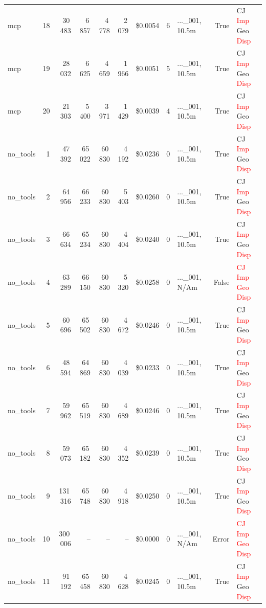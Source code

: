 \documentclass[a4paper,11pt]{article}
\begin{document}
\begin{table}[H]
{\begin{tabular}{l r r r r r r r l r l}
mcp & 18 & 30\,483 & 6\,857 & 4\,778 & 2\,079 & \$0.0054 & 6 & ...\_001, 10.5m & True & CJ \textcolor{red}{Imp} Geo \textcolor{red}{Disp} \\
mcp & 19 & 28\,032 & 6\,625 & 4\,659 & 1\,966 & \$0.0051 & 5 & ...\_001, 10.5m & True & CJ \textcolor{red}{Imp} Geo \textcolor{red}{Disp} \\
mcp & 20 & 21\,303 & 5\,400 & 3\,971 & 1\,429 & \$0.0039 & 4 & ...\_001, 10.5m & True & CJ \textcolor{red}{Imp} Geo \textcolor{red}{Disp} \\
\midrule
no\_tools & 1 & 47\,392 & 65\,022 & 60\,830 & 4\,192 & \$0.0236 & 0 & ...\_001, 10.5m & True & CJ \textcolor{red}{Imp} Geo \textcolor{red}{Disp} \\
no\_tools & 2 & 64\,956 & 66\,233 & 60\,830 & 5\,403 & \$0.0260 & 0 & ...\_001, 10.5m & True & CJ \textcolor{red}{Imp} Geo \textcolor{red}{Disp} \\
no\_tools & 3 & 66\,634 & 65\,234 & 60\,830 & 4\,404 & \$0.0240 & 0 & ...\_001, 10.5m & True & CJ \textcolor{red}{Imp} Geo \textcolor{red}{Disp} \\
no\_tools & 4 & 63\,289 & 66\,150 & 60\,830 & 5\,320 & \$0.0258 & 0 & ...\_001, N/Am & False & \textcolor{red}{CJ} \textcolor{red}{Imp} \textcolor{red}{Geo} \textcolor{red}{Disp} \\
no\_tools & 5 & 60\,696 & 65\,502 & 60\,830 & 4\,672 & \$0.0246 & 0 & ...\_001, 10.5m & True & CJ \textcolor{red}{Imp} Geo \textcolor{red}{Disp} \\
no\_tools & 6 & 48\,594 & 64\,869 & 60\,830 & 4\,039 & \$0.0233 & 0 & ...\_001, 10.5m & True & CJ \textcolor{red}{Imp} Geo \textcolor{red}{Disp} \\
no\_tools & 7 & 59\,962 & 65\,519 & 60\,830 & 4\,689 & \$0.0246 & 0 & ...\_001, 10.5m & True & CJ \textcolor{red}{Imp} Geo \textcolor{red}{Disp} \\
no\_tools & 8 & 59\,073 & 65\,182 & 60\,830 & 4\,352 & \$0.0239 & 0 & ...\_001, 10.5m & True & CJ \textcolor{red}{Imp} Geo \textcolor{red}{Disp} \\
no\_tools & 9 & 131\,316 & 65\,748 & 60\,830 & 4\,918 & \$0.0250 & 0 & ...\_001, 10.5m & True & CJ \textcolor{red}{Imp} Geo \textcolor{red}{Disp} \\
no\_tools & 10 & 300\,006 & -- & -- & -- & \$0.0000 & 0 & ...\_001, N/Am & Error & \textcolor{red}{CJ} \textcolor{red}{Imp} \textcolor{red}{Geo} \textcolor{red}{Disp} \\
no\_tools & 11 & 91\,192 & 65\,458 & 60\,830 & 4\,628 & \$0.0245 & 0 & ...\_001, 10.5m & True & CJ \textcolor{red}{Imp} Geo \textcolor{red}{Disp} \\

\end{tabular}}
\end{table}
\end{document}
